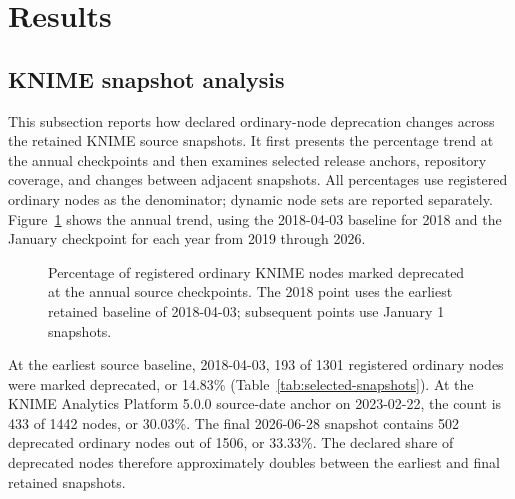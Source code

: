 \documentclass[runningheads]{llncs}
\begin{document}
\section{Results}

\subsection{KNIME snapshot analysis}

This subsection reports how declared ordinary-node deprecation changes across
the retained KNIME source snapshots. It first presents the percentage trend at
the annual checkpoints and then examines selected release anchors, repository
coverage, and changes between adjacent snapshots. All percentages use
registered ordinary nodes as the denominator; dynamic node sets are reported
separately. Figure~\ref{fig:deprecated-percent-year} shows the annual trend,
using the 2018-04-03 baseline for 2018 and the January checkpoint for each year
from 2019 through 2026.

\begin{figure}
\centering
{}
\caption{Percentage of registered ordinary KNIME nodes marked deprecated at
the annual source checkpoints. The 2018 point uses the earliest retained
baseline of 2018-04-03; subsequent points use January 1 snapshots.}
\label{fig:deprecated-percent-year}
\end{figure}

At the earliest source baseline, 2018-04-03, 193 of 1301 registered ordinary
nodes were marked deprecated, or 14.83\% (Table~\ref{tab:selected-snapshots}).
At the KNIME Analytics Platform 5.0.0 source-date anchor on 2023-02-22, the
count is 433 of 1442 nodes, or 30.03\%. The final 2026-06-28 snapshot contains
502 deprecated ordinary nodes out of 1506, or 33.33\%. The declared share of
deprecated nodes therefore approximately doubles between the earliest and
final retained snapshots.
\end{document}
